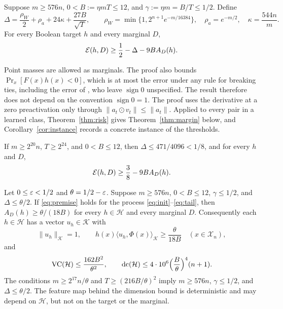 \documentclass[11pt,letterpaper,pmlr,twoside]{jmlr}
\newcommand{\X}{\mathcal X}\newcommand{\Hc}{\mathcal H}
\newcommand{\Kc}{\mathcal K}\newcommand{\sgn}{\operatorname{sign}}
\newcommand{\ip}[2]{\langle #1,#2\rangle}\newcommand{\norm}[1]{\lVert #1\rVert}
\begin{document}
\begin{theorem}
\label{thm:risk}
Suppose $m\ge576n$, $0<B:=\eta mT\le12$, and $\gamma:=\eta m=B/T\le1/2$. Define
\begin{equation}
 \Delta=\frac{\rho_W}{2}+\rho_a+24\kappa+\frac{27B}{\sqrt T},\qquad
 \rho_W=\min\{1,2^{n+1}e^{-m/16384}\},\quad
 \rho_a=e^{-m/2},\quad \kappa=\frac{544n}{m}.
 \label{eq:Delta}
\end{equation}
For every Boolean target $h$ and every marginal $D$,
\begin{equation}
 \mathcal E(h,D)\ge\frac12-\Delta-9B A_D(h).
 \label{eq:risk-general}
\end{equation}
\end{theorem}

Point masses are allowed as marginals. The proof also bounds $\Pr_x[F(x)h(x)<0]$, which is at most the error under any rule for breaking ties, including the error of \citet{FKS26}, who leave $\sgn0$ unspecified. The result therefore does not depend on the convention $\sgn0=1$. The proof uses the derivative at a zero preactivation only through $\norm{a_t\odot v_t}\le\norm{a_t}$. Applied to every pair in a learned class, Theorem~\ref{thm:risk} gives Theorem~\ref{thm:margin} below, and Corollary~\ref{cor:instance} records a concrete instance of the thresholds.

\begin{corollary}
\label{cor:instance}
If $m\ge2^{20}n$, $T\ge2^{24}$, and $0<B\le12$, then $\Delta\le471/4096<1/8$, and for every $h$ and $D$,
\begin{equation}
 \mathcal E(h,D)\ge\frac38-9B A_D(h).
 \label{eq:risk-simple}
\end{equation}
\end{corollary}

\begin{theorem}
\label{thm:margin}
Let $0\le\varepsilon<1/2$ and $\theta=1/2-\varepsilon$. Suppose $m\ge576n$, $0<B\le12$, $\gamma\le1/2$, and $\Delta\le\theta/2$. If \eqref{eq:premise} holds for the process \eqref{eq:init}--\eqref{eq:tail}, then $A_D(h)\ge\theta/(18B)$ for every $h\in\Hc$ and every marginal $D$. Consequently each $h\in\Hc$ has a vector $u_h\in\Kc$ with
\begin{equation}
 \norm{u_h}_{\Kc}=1,\qquad
 h(x)\ip{u_h}{\Phi(x)}_{\Kc}\ge\frac{\theta}{18B}
 \quad(x\in\X_n),
 \label{eq:kernelmargin}
\end{equation}
and
\begin{equation}
 \VC(\Hc)\le\frac{162B^2}{\theta^2},
 \qquad
 \dc(\Hc)\le4\cdot10^6\Bigl(\frac B\theta\Bigr)^4(n+1).
 \label{eq:ordinarybound}
\end{equation}
The conditions $m\ge2^{17}n/\theta$ and $T\ge(216B/\theta)^2$ imply $m\ge576n$, $\gamma\le1/2$, and $\Delta\le\theta/2$. The feature map behind the dimension bound is deterministic and may depend on $\Hc$, but not on the target or the marginal.
\end{theorem}
\end{document}
